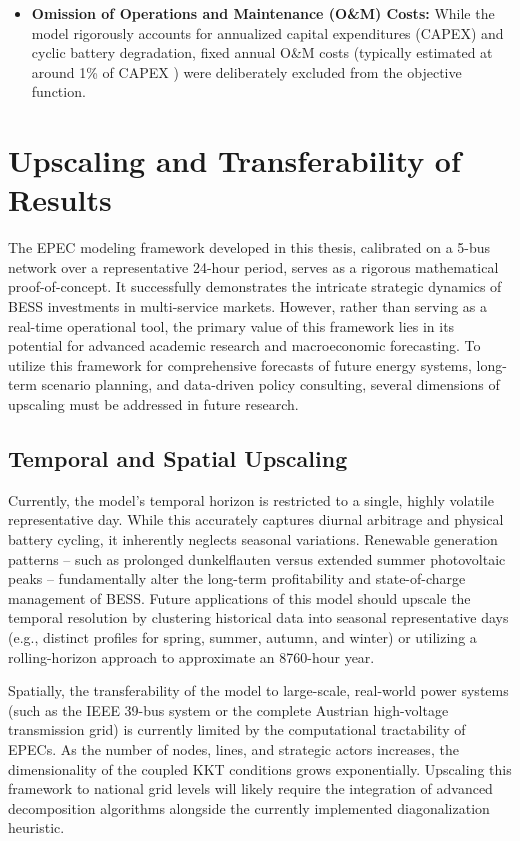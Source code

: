 \begin{itemize}
    \item \textbf{Omission of Operations and Maintenance (O\&M) Costs:} While the model rigorously accounts for annualized capital expenditures (CAPEX) and cyclic battery degradation, fixed annual O\&M costs (typically estimated at around 1\% of CAPEX \cite{shin_optimal_2020}) were deliberately excluded from the objective function.


\end{itemize}

\section{Upscaling and Transferability of Results} \label{sec:upscaling}

The EPEC modeling framework developed in this thesis, calibrated on a 5-bus network over a representative 24-hour period, serves as a rigorous mathematical proof-of-concept. It successfully demonstrates the intricate strategic dynamics of BESS investments in multi-service markets. However, rather than serving as a real-time operational tool, the primary value of this framework lies in its potential for advanced academic research and macroeconomic forecasting. To utilize this framework for comprehensive forecasts of future energy systems, long-term scenario planning, and data-driven policy consulting, several dimensions of upscaling must be addressed in future research.

\subsection{Temporal and Spatial Upscaling}
Currently, the model's temporal horizon is restricted to a single, highly volatile representative day. While this accurately captures diurnal arbitrage and physical battery cycling, it inherently neglects seasonal variations. Renewable generation patterns -- such as prolonged dunkelflauten versus extended summer photovoltaic peaks -- fundamentally alter the long-term profitability and state-of-charge management of BESS. Future applications of this model should upscale the temporal resolution by clustering historical data into seasonal representative days (e.g., distinct profiles for spring, summer, autumn, and winter) or utilizing a rolling-horizon approach to approximate an 8760-hour year. 

Spatially, the transferability of the model to large-scale, real-world power systems (such as the IEEE 39-bus system or the complete Austrian high-voltage transmission grid) is currently limited by the computational tractability of EPECs. As the number of nodes, lines, and strategic actors increases, the dimensionality of the coupled KKT conditions grows exponentially. Upscaling this framework to national grid levels will likely require the integration of advanced decomposition algorithms alongside the currently implemented diagonalization heuristic.

